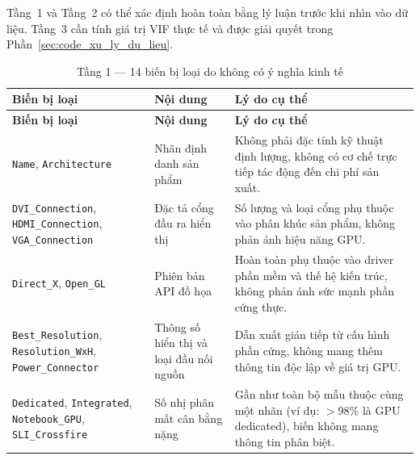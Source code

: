 Tầng~1 và Tầng~2 có thể xác định hoàn toàn bằng lý luận trước khi nhìn vào dữ liệu. Tầng~3 cần tính giá trị VIF thực tế và được giải quyết trong Phần~\ref{sec:code_xu_ly_du_lieu}.

\renewcommand{\arraystretch}{1.1}
\small
\setlength\LTleft{\fill}
\setlength\LTright{\fill}
\begin{longtable}{|p{5.2cm}|p{3.5cm}|p{5.5cm}|}
\caption{Tầng 1 --- 14 biến bị loại do không có ý nghĩa kinh tế}
\label{tab:tier1_vars} \\
\hline
\textbf{Biến bị loại} & \textbf{Nội dung} & \textbf{Lý do cụ thể} \\
\hline
\endfirsthead
\hline
\textbf{Biến bị loại} & \textbf{Nội dung} & \textbf{Lý do cụ thể} \\
\hline
\endhead
\hline
\endlastfoot
\texttt{Name}, \texttt{Architecture}
  & Nhãn định danh sản phẩm
  & Không phải đặc tính kỹ thuật định lượng, không có cơ chế trực tiếp tác động đến chi phí sản xuất. \\
\hline
\texttt{DVI\_Connection}, \texttt{HDMI\_Connection}, \texttt{VGA\_Connection}
  & Đặc tả cổng đầu ra hiển thị
  & Số lượng và loại cổng phụ thuộc vào phân khúc sản phẩm, không phản ánh hiệu năng GPU. \\
\hline
\texttt{Direct\_X}, \texttt{Open\_GL}
  & Phiên bản API đồ họa
  & Hoàn toàn phụ thuộc vào driver phần mềm và thế hệ kiến trúc, không phản ánh sức mạnh phần cứng thực. \\
\hline
\texttt{Best\_Resolution}, \texttt{Resolution\_WxH}, \texttt{Power\_Connector}
  & Thông số hiển thị và loại đầu nối nguồn
  & Dẫn xuất gián tiếp từ cấu hình phần cứng, không mang thêm thông tin độc lập về giá trị GPU. \\
\hline
\texttt{Dedicated}, \texttt{Integrated}, \texttt{Notebook\_GPU}, \texttt{SLI\_Crossfire}
  & Số nhị phân mất cân bằng nặng
  & Gần như toàn bộ mẫu thuộc cùng một nhãn (ví dụ: $>$98\% là GPU dedicated), biến không mang thông tin phân biệt. \\
\hline
\end{longtable}
\normalsize

